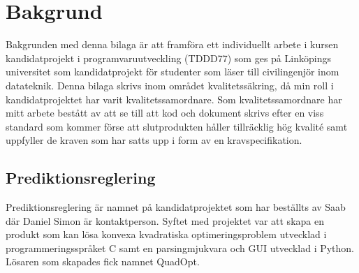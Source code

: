 \section{Bakgrund}
Bakgrunden med denna bilaga är att framföra ett individuellt arbete i kursen kandidatprojekt i programvaruutveckling (TDDD77) som ges på Linköpings universitet som kandidatprojekt för studenter som läser till civilingenjör inom datateknik. 
\newline
\newline
Denna bilaga skrivs inom området kvalitetssäkring, då min roll i kandidatprojektet har varit kvalitetssamordnare. Som kvalitetssamordnare har mitt arbete bestått av att se till att kod och dokument skrivs efter en viss standard som kommer förse att slutprodukten håller tillräcklig hög kvalité samt uppfyller de kraven som har satts upp i form av en kravspecifikation.

\subsection{Prediktionsreglering}
Prediktionsreglering är namnet på kandidatprojektet som har beställts av Saab där Daniel Simon är kontaktperson. Syftet med projektet var att skapa en produkt som kan lösa konvexa kvadratiska optimeringsproblem utvecklad i programmeringsspråket C samt en parsingmjukvara och GUI utvecklad i Python. Lösaren som skapades fick namnet QuadOpt.
